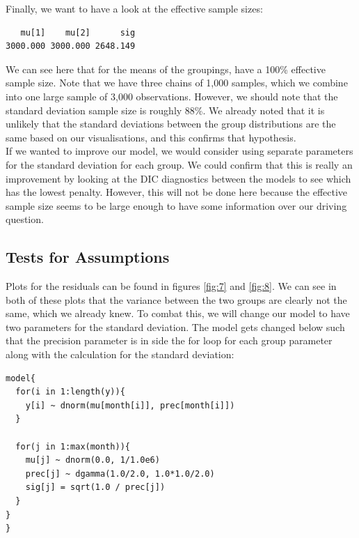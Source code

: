 \documentclass[journal, a4paper]{IEEEtran}
\begin{document}
\newpage

Finally, we want to have a look at the effective sample sizes:\\

\begin{verbatim}
   mu[1]    mu[2]      sig 
3000.000 3000.000 2648.149 
\end{verbatim}

We can see here that for the means of the groupings, have a 100\% effective sample size. Note that we have three chains of 1,000 samples, which we combine into
one large sample of 3,000 observations. However, we should note that the standard deviation sample size is roughly 88\%. We already noted that it is unlikely
that the standard deviations between the group distributions are the same based on our visualisations, and this confirms that hypothesis.\\

If we wanted to improve our model, we would consider using separate parameters for the standard deviation for each group. We could confirm that this is really
an improvement by looking at the DIC diagnostics between the models to see which has the lowest penalty. However, this will not be done here because the 
effective sample size seems to be large enough to have some information over our driving question.

\subsection{Tests for Assumptions}

Plots for the residuals can be found in figures \ref{fig:7} and \ref{fig:8}. We can see in both of these plots that the variance between the two groups are 
clearly not the same, which we already knew. To combat this, we will change our model to have two parameters for the standard deviation. The model gets changed
below such that the precision parameter is in side the for loop for each group parameter along with the calculation for the standard deviation:\\

\begin{lstlisting}
model{
  for(i in 1:length(y)){
    y[i] ~ dnorm(mu[month[i]], prec[month[i]])
  }
  
  for(j in 1:max(month)){
    mu[j] ~ dnorm(0.0, 1/1.0e6)
    prec[j] ~ dgamma(1.0/2.0, 1.0*1.0/2.0)
    sig[j] = sqrt(1.0 / prec[j])
  }
}
}
\end{lstlisting}
\end{document}
